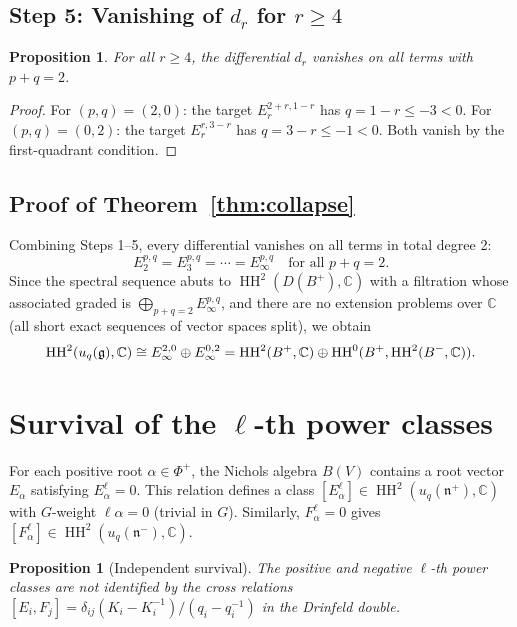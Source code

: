 \documentclass[11pt,letterpaper]{amsart}
\theoremstyle{plain}
\newtheorem{proposition}[theorem]{Proposition}
\theoremstyle{definition}
\theoremstyle{remark}
\newcommand{\HH}{\operatorname{HH}}
\newcommand{\CC}{\mathbb{C}}
\newcommand{\bplus}{B^{+}}
\newcommand{\bminus}{B^{-}}
\begin{document}
\subsection{Step 5: Vanishing of $d_r$ for $r \geq 4$}

\begin{proposition}
For all $r \geq 4$, the differential $d_r$ vanishes on all terms with $p + q = 2$.
\end{proposition}

\begin{proof}
For $(p,q) = (2,0)$: the target $E_r^{2+r, 1-r}$ has $q = 1-r \leq -3 < 0$. For $(p,q) = (0,2)$: the target $E_r^{r, 3-r}$ has $q = 3-r \leq -1 < 0$. Both vanish by the first-quadrant condition.
\end{proof}

\subsection{Proof of Theorem~\ref{thm:collapse}}

Combining Steps 1--5, every differential vanishes on all terms in total degree 2:
\[
E_2^{p,q} = E_3^{p,q} = \cdots = E_\infty^{p,q} \quad \text{for all } p + q = 2.
\]
Since the spectral sequence abuts to $\HH^2(D(\bplus), \CC)$ with a filtration whose associated graded is $\bigoplus_{p+q=2} E_\infty^{p,q}$, and there are no extension problems over $\CC$ (all short exact sequences of vector spaces split), we obtain
\[
\HH^2(u_q(\mathfrak{g}), \CC) \cong E_\infty^{2,0} \oplus E_\infty^{0,2} = \HH^2(\bplus, \CC) \oplus \HH^0(\bplus, \HH^2(\bminus, \CC)). \qedhere
\]

\section{Survival of the $\ell$-th power classes}
\label{sec:lth}
For each positive root $\alpha \in \Phi^+$, the Nichols algebra $B(V)$ contains a root vector $E_\alpha$ satisfying $E_\alpha^\ell = 0$. This relation defines a class $[E_\alpha^\ell] \in \HH^2(u_q(\mathfrak{n}^+), \CC)$ with $G$-weight $\ell\alpha = 0$ (trivial in $G$). Similarly, $F_\alpha^\ell = 0$ gives $[F_\alpha^\ell] \in \HH^2(u_q(\mathfrak{n}^-), \CC)$.

\begin{proposition}[Independent survival]
\label{prop:survival}
The positive and negative $\ell$-th power classes are not identified by the cross relations $[E_i, F_j] = \delta_{ij}(K_i - K_i^{-1})/(q_i - q_i^{-1})$ in the Drinfeld double.
\end{proposition}
\end{document}
